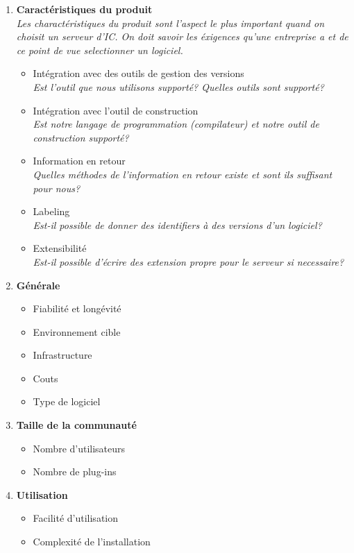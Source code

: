 \begin{enumerate}
\item \textbf{Caractéristiques du produit} \\
\textit{Les charactéristiques du produit sont l'aspect le plus important quand on choisit un serveur d'IC. On doit savoir les éxigences qu'une entreprise a et de ce point de vue selectionner un logiciel.}
	\begin{itemize}
		\item Intégration avec des outils de gestion des versions \\
		\textit{Est l'outil que nous utilisons supporté? Quelles outils sont supporté?}
		\item Intégration avec l'outil de construction \\
		\textit{Est notre langage de programmation (compilateur) et notre outil de construction supporté?}
		\item Information en retour \\
		\textit{Quelles méthodes de l'information en retour existe et sont ils suffisant pour nous?}
		\item Labeling \\
		\textit{Est-il possible de donner des identifiers à des versions d'un logiciel?}
		\item Extensibilité \\
		\textit{Est-il possible d'écrire des extension propre pour le serveur si necessaire?}
	\end{itemize}
\item \textbf{Générale}
	\begin{itemize}
		\item Fiabilité et longévité
		\item Environnement cible
		\item Infrastructure
		\item Couts
		\item Type de logiciel
	\end{itemize}
\item \textbf{Taille de la communauté}
	\begin{itemize}
		\item Nombre d'utilisateurs
		\item Nombre de plug-ins
	\end{itemize}
\item \textbf{Utilisation}
	\begin{itemize}
		\item Facilité d'utilisation
		\item Complexité de l'installation
	\end{itemize}
\end{enumerate}
